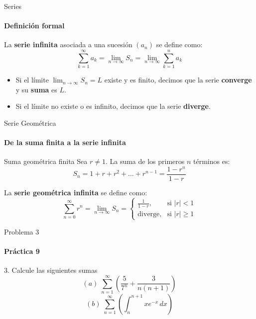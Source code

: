\documentclass{plantillaPPT}
\begin{document}
\begin{frame}{Series}
\framesubtitle{Definición formal}
\begin{definicion}
    La \textbf{serie infinita} asociada a una sucesión \((a_n)\) se define como:
    \[
    \sum_{k=1}^{\infty} a_k = \lim_{n \to \infty} S_n = \lim_{n \to \infty} \sum_{k=1}^{n} a_k
    \]
    \begin{itemize}
        \item Si el límite \( \displaystyle \lim_{n \to \infty} S_n = L \) existe y es finito, decimos que la serie \textbf{converge} y su \textbf{suma} es \(L\).
        \item Si el límite no existe o es infinito, decimos que la serie \textbf{diverge}.
    \end{itemize}
\end{definicion}
\end{frame}

\begin{frame}{Serie Geométrica}
\framesubtitle{De la suma finita a la serie infinita}

\begin{block}{Suma geométrica finita}
    Sea \(r \neq 1\). La suma de los primeros \(n\) términos es:
    \[
    S_n = 1 + r + r^2 + \dots + r^{n-1} = \frac{1 - r^n}{1 - r}
    \]
\end{block}

\vspace{-15pt}

\begin{definicion}
    La \textbf{serie geométrica infinita} se define como:
    \[
    \sum_{n=0}^{\infty} r^n = \lim_{n \to \infty} S_n =
    \begin{cases}
        \displaystyle \frac{1}{1 - r}, & \text{si } |r| < 1 \\[1.5ex]
        \text{diverge}, & \text{si } |r| \ge 1
    \end{cases}
    \]
\end{definicion}

\end{frame}


\begin{frame}{Problema 3}
\framesubtitle{Práctica 9}

3. Calcule las siguientes sumas
\vspace{10pt}
\[
(a)\; \sum_{n=1}^\infty \left(\frac{5}{7^n} + \frac{3}{n(n+1)}\right)
\]
\vspace{5pt}
\[
(b)\; \sum_{n=1}^\infty \left(\int_n^{n+1}xe^{-x}\,dx\right)
\]


\end{frame}
\end{document}
